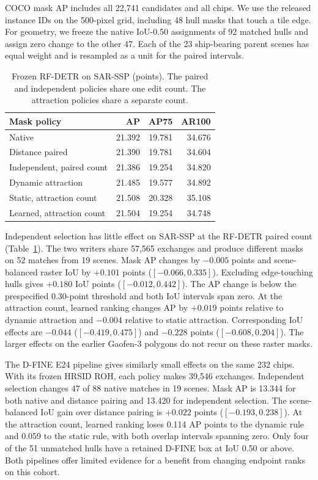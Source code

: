 \documentclass[journal]{IEEEtran}
\begin{document}
COCO mask AP includes all 22,741 candidates and all chips. We use the released instance IDs on the 500-pixel grid, including 48 hull masks that touch a tile edge. For geometry, we freeze the native IoU-0.50 assignments of 92 matched hulls and assign zero change to the other 47. Each of the 23 ship-bearing parent scenes has equal weight and is resampled as a unit for the paired intervals.

\begin{table}[t]
\centering
\caption{Frozen RF-DETR on SAR-SSP (points). The paired and independent policies share one edit count. The attraction policies share a separate count.}
\label{tab:sar-ssp}
\footnotesize
\begin{tabular}{@{}lrrr@{}}
\toprule
Mask policy & AP & AP75 & AR100 \\
\midrule
Native & 21.392 & 19.781 & 34.676 \\
Distance paired & 21.390 & 19.781 & 34.604 \\
Independent, paired count & 21.386 & 19.254 & 34.820 \\
\midrule
Dynamic attraction & 21.485 & 19.577 & 34.892 \\
Static, attraction count & 21.508 & 20.328 & 35.108 \\
Learned, attraction count & 21.504 & 19.254 & 34.748 \\
\bottomrule
\end{tabular}
\end{table}

Independent selection has little effect on SAR-SSP at the RF-DETR paired count (Table~\ref{tab:sar-ssp}). The two writers share 57,565 exchanges and produce different masks on 52 matches from 19 scenes. Mask AP changes by \(-0.005\) points and scene-balanced raster IoU by \(+0.101\) points (\([-0.066,0.335]\)). Excluding edge-touching hulls gives \(+0.180\) IoU points (\([-0.012,0.442]\)). The AP change is below the prespecified 0.30-point threshold and both IoU intervals span zero. At the attraction count, learned ranking changes AP by \(+0.019\) points relative to dynamic attraction and \(-0.004\) relative to static attraction. Corresponding IoU effects are \(-0.044\) (\([-0.419,0.475]\)) and \(-0.228\) points (\([-0.608,0.204]\)). The larger effects on the earlier Gaofen-3 polygons do not recur on these raster masks.

The D-FINE E24 pipeline gives similarly small effects on the same 232 chips. With its frozen HRSID ROH, each policy makes 39,546 exchanges. Independent selection changes 47 of 88 native matches in 19 scenes. Mask AP is 13.344 for both native and distance pairing and 13.420 for independent selection. The scene-balanced IoU gain over distance pairing is \(+0.022\) points (\([-0.193,0.238]\)). At the attraction count, learned ranking loses 0.114 AP points to the dynamic rule and 0.059 to the static rule, with both overlap intervals spanning zero. Only four of the 51 unmatched hulls have a retained D-FINE box at IoU 0.50 or above. Both pipelines offer limited evidence for a benefit from changing endpoint ranks on this cohort.
\end{document}
